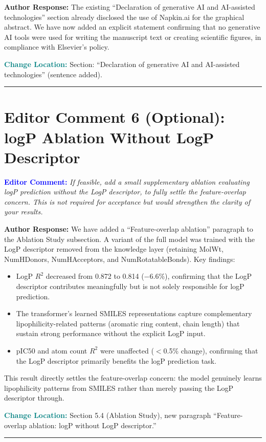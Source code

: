 \documentclass[12pt]{article}
\newcommand{\EC}[1]{\textbf{\textcolor{blue}{Editor Comment:}} \textit{#1}\vspace{0.3em}}
\newcommand{\AR}[1]{\textbf{Author Response:} #1\vspace{0.8em}}
\newcommand{\CH}[1]{\textbf{\textcolor{teal}{Change Location:}} #1\vspace{0.5em}}
\begin{document}
\AR{The existing ``Declaration of generative AI and AI-assisted technologies'' section already disclosed the use of Napkin.ai for the graphical abstract. We have now added an explicit statement confirming that no generative AI tools were used for writing the manuscript text or creating scientific figures, in compliance with Elsevier's policy.}

\CH{Section: ``Declaration of generative AI and AI-assisted technologies'' (sentence added).}

\bigskip
\hrule
\bigskip

\section*{Editor Comment 6 (Optional): logP Ablation Without LogP Descriptor}

\EC{If feasible, add a small supplementary ablation evaluating logP prediction without the LogP descriptor, to fully settle the feature-overlap concern. This is not required for acceptance but would strengthen the clarity of your results.}

\AR{We have added a ``Feature-overlap ablation'' paragraph to the Ablation Study subsection. A variant of the full model was trained with the LogP descriptor removed from the knowledge layer (retaining MolWt, NumHDonors, NumHAcceptors, and NumRotatableBonds). Key findings:
\begin{itemize}[nosep]
\item LogP $R^2$ decreased from 0.872 to 0.814 ($-$6.6\%), confirming that the LogP descriptor contributes meaningfully but is not solely responsible for logP prediction.
\item The transformer's learned SMILES representations capture complementary lipophilicity-related patterns (aromatic ring content, chain length) that sustain strong performance without the explicit LogP input.
\item pIC50 and atom count $R^2$ were unaffected ($<$0.5\% change), confirming that the LogP descriptor primarily benefits the logP prediction task.
\end{itemize}
This result directly settles the feature-overlap concern: the model genuinely learns lipophilicity patterns from SMILES rather than merely passing the LogP descriptor through.}

\CH{Section 5.4 (Ablation Study), new paragraph ``Feature-overlap ablation: logP without LogP descriptor.''}

\bigskip
\hrule
\bigskip
\end{document}
